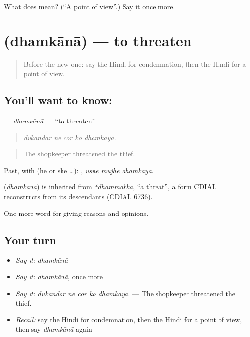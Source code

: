 \begin{tcolorbox}[breakable,colback=teal!4,colframe=teal!35!black,title={Before you move on}]
What does  mean? (\textquotedblleft{}A point of view\textquotedblright{}.) Say it once more.
\end{tcolorbox}
\section[\texorpdfstring{\hi{धमकाना} (dhamkānā)}{धमकाना (dhamkānā)}]{ (dhamkānā) — to threaten}

\label{lesson:HI-C360-dhamkana}



\begin{quote}
Before the new one: say the Hindi for condemnation, then the Hindi for a point of view.
\end{quote}

\subsection*{You'll want to know: }
\textbf{} — \emph{dhamkānā} — \textquotedblleft{}to threaten\textquotedblright{}.

\begin{quote}
    
\end{quote}

\begin{quote}
\emph{dukāndār ne cor ko dhamkāyā.}
\end{quote}

\begin{quote}
The shopkeeper threatened the thief.
\end{quote}

Past, with  (he or she …):   , \emph{usne mujhe dhamkāyā}.

\begin{cousinweb}
\textbf{} (\emph{dhamkānā}) is inherited from \emph{*dhammakka}, \textquotedblleft{}a threat\textquotedblright{}, a form CDIAL reconstructs from its descendants (CDIAL 6736).
\end{cousinweb}

\begin{grammarlens}[title={What you've built}]
One more word for giving reasons and opinions.
\end{grammarlens}

\subsection*{Your turn}
\begin{itemize}
\raggedright
  \item \emph{Say it:} \emph{dhamkānā}
  \item \emph{Say it:} \emph{dhamkānā}, once more
  \item \emph{Say it:} \emph{dukāndār ne cor ko dhamkāyā.} — The shopkeeper threatened the thief.
  \item \emph{Recall:} say the Hindi for condemnation, then the Hindi for a point of view, then say \emph{dhamkānā} again
\end{itemize}

